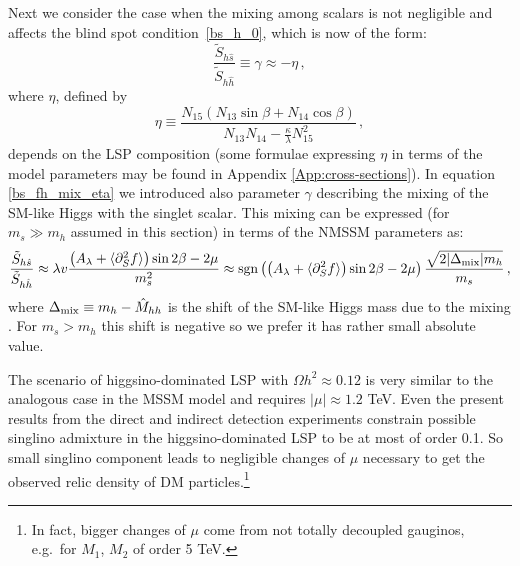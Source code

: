 \documentclass[12pt,twoside]{article}
\def\pa{\partial}
\begin{document}
Next we consider the case when the mixing among scalars is not negligible 
and affects the blind spot condition~\eqref{bs_h_0}, which is now of the form: 
%
%
\begin{equation}
\label{bs_fh_mix_eta}
\frac{\tilde{S}_{h\hat{s}}}{\tilde{S}_{h\hat{h}}}
\equiv\gamma
\approx-\eta\,,
\end{equation}
%
%
where $\eta$, defined by
%
\begin{equation}
\label{eta_def}
\eta
\equiv
\frac{N_{15}(N_{13}\sin\beta+N_{14}\cos\beta)}
{N_{13}N_{14}-\frac{\kappa}{\lambda}N_{15}^2}
\,,
\end{equation}
%
depends on the LSP composition (some formulae expressing $\eta$ in terms 
of the model parameters may be found in Appendix \ref{App:cross-sections}).
In equation \eqref{bs_fh_mix_eta} we introduced also parameter $\gamma$
describing the mixing of the SM-like Higgs with the singlet scalar. 
This mixing can be expressed (for $m_s\gg m_h$ assumed in this section) 
in terms of the NMSSM parameters as:
%
\begin{equation}
\label{eq:Ssh}
\frac{\tilde{S}_{h\hat{s}}}{\tilde{S}_{h\hat{h}}}
\approx
\lambda v\frac{\left(A_{\lambda}+\langle\pa_S^2 f\rangle\right)\sin2\beta-2\mu}{m_s^2}
\approx
{\rm sgn}\left(\left(A_{\lambda}+\langle\pa_S^2 f\rangle\right)\sin2\beta-2\mu\right)\frac{\sqrt{2|\Delta_{\rm mix}|m_h}}{m_s}
\,,
\end{equation}
%
%
where $\Delta_{\rm mix} \equiv m_h - \hat{M}_{hh}$ is the shift of the 
SM-like Higgs mass due to the mixing \cite{Badziak:2013bda}. For $m_s>m_h$ this shift is 
negative so we prefer it has rather small absolute value.


The scenario of higgsino-dominated LSP with $\Omega h^2\approx0.12$ is very similar 
to the analogous case in the MSSM model and requires $|\mu|\approx1.2$ TeV. 
Even the present results from the direct and indirect detection 
experiments constrain possible singlino admixture in the higgsino-dominated 
LSP to be at most of order 0.1. So small singlino component leads to 
negligible changes of $\mu$ necessary to get the observed relic 
density of DM particles.\footnote{
In fact, bigger changes of $\mu$ come from not totally decoupled gauginos,
e.g.~for $M_1$, $M_2$ of order 5 TeV.
}
\end{document}
